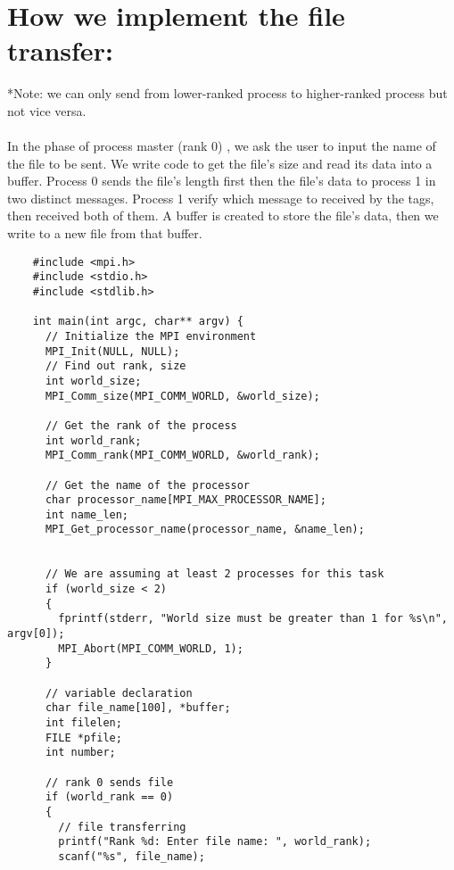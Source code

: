 \documentclass[12pt]{article}
\begin{document}
  \section{How we implement the file transfer:}
    *Note: we can only send from lower-ranked process to higher-ranked process but not vice versa.\\\\
    In the phase of process master (rank 0) , we ask the user to input the name of the file to be sent. We write code to get the file's size and read its data into a buffer. Process 0 sends the file's length first then the file's data to process 1 in two distinct messages. Process 1 verify which message to received by the tags, then received both of them. A buffer is created to store the file's data, then we write to a new file from that buffer.    
    \begin{verbatim}
    #include <mpi.h>
    #include <stdio.h>
    #include <stdlib.h>
    
    int main(int argc, char** argv) {
      // Initialize the MPI environment
      MPI_Init(NULL, NULL);
      // Find out rank, size
      int world_size;
      MPI_Comm_size(MPI_COMM_WORLD, &world_size);
    
      // Get the rank of the process
      int world_rank;
      MPI_Comm_rank(MPI_COMM_WORLD, &world_rank);
    
      // Get the name of the processor
      char processor_name[MPI_MAX_PROCESSOR_NAME];
      int name_len;
      MPI_Get_processor_name(processor_name, &name_len);

    
      // We are assuming at least 2 processes for this task
      if (world_size < 2)
      {
        fprintf(stderr, "World size must be greater than 1 for %s\n", argv[0]);
        MPI_Abort(MPI_COMM_WORLD, 1);
      }	
    
      // variable declaration 
      char file_name[100], *buffer;       
      int filelen;
      FILE *pfile;
      int number;
    
      // rank 0 sends file
      if (world_rank == 0) 
      {
        // file transferring 
        printf("Rank %d: Enter file name: ", world_rank);
        scanf("%s", file_name);
    

\end{verbatim}
\end{document}
